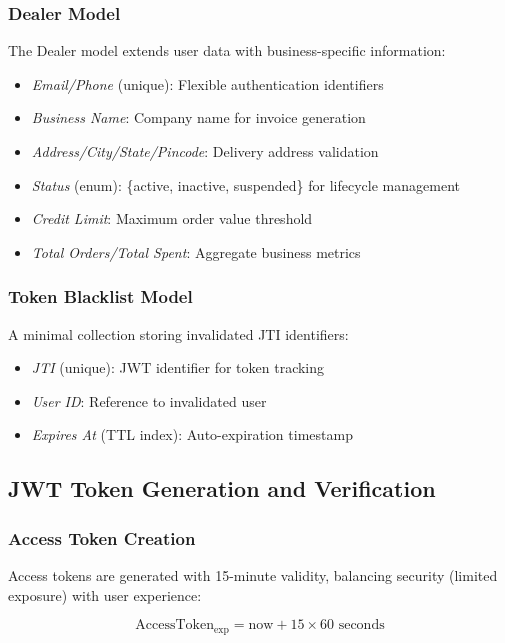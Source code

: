 \documentclass[conference]{IEEEtran}
\begin{document}
\subsubsection{Dealer Model}
The Dealer model extends user data with business-specific information:
\begin{itemize}
\item \textit{Email/Phone} (unique): Flexible authentication identifiers
\item \textit{Business Name}: Company name for invoice generation
\item \textit{Address/City/State/Pincode}: Delivery address validation
\item \textit{Status} (enum): \{active, inactive, suspended\} for lifecycle management
\item \textit{Credit Limit}: Maximum order value threshold
\item \textit{Total Orders/Total Spent}: Aggregate business metrics
\end{itemize}

\subsubsection{Token Blacklist Model}
A minimal collection storing invalidated JTI identifiers:
\begin{itemize}
\item \textit{JTI} (unique): JWT identifier for token tracking
\item \textit{User ID}: Reference to invalidated user
\item \textit{Expires At} (TTL index): Auto-expiration timestamp
\end{itemize}

\subsection{JWT Token Generation and Verification}

\subsubsection{Access Token Creation}
Access tokens are generated with 15-minute validity, balancing security (limited exposure) with user experience:

\begin{equation}
\text{AccessToken}_{\text{exp}} = \text{now} + 15 \times 60 \text{ seconds}
\end{equation}
\end{document}
